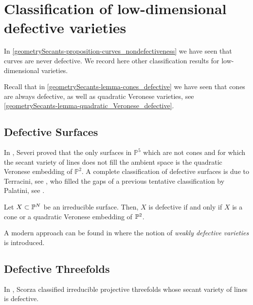 \section{Classification of low-dimensional defective varieties}
\label{geometrySecants-section-classification}

In \ref{geometrySecants-proposition-curves_nondefectiveness} we have seen that curves are never defective. We record here other classification results for low-dimensional varieties.

Recall that in \ref{geometrySecants-lemma-cones_defective} we have seen that cones are always defective, as well as quadratic Veronese varieties, see \ref{geometrySecants-lemma-quadratic_Veronese_defective}. 

\subsection{Defective Surfaces}
\label{geometrySecants-section-defective_surfaces}
In \cite{Sev01}, Severi proved that the only surfaces in $\mathbb{P}^5$ which are not cones and for which the secant variety of lines does not fill the ambient space is the quadratic Veronese embedding of $\mathbb{P}^2$. A complete classification of defective surfaces is due to Terracini, see \cite{Ter21}, who filled the gaps of a previous tentative classification by Palatini, see \cite{Pal06}. 

\begin{theorem}
\label{geometrySecants-theorem-defective_surfaces}
    Let $X \subset \mathbb{P}^N$ be an irreducible surface. Then, $X$ is defective if and only if $X$ is a cone or a quadratic Veronese embedding of $\mathbb{P}^2$.
\end{theorem}

A modern approach can be found in \cite{CC02} where the notion of {\it weakly defective varieties} is introduced.

\subsection{Defective Threefolds}
In \cite{Sco08}, Scorza classified irreducible projective threefolds whose secant variety of lines is defective. 

